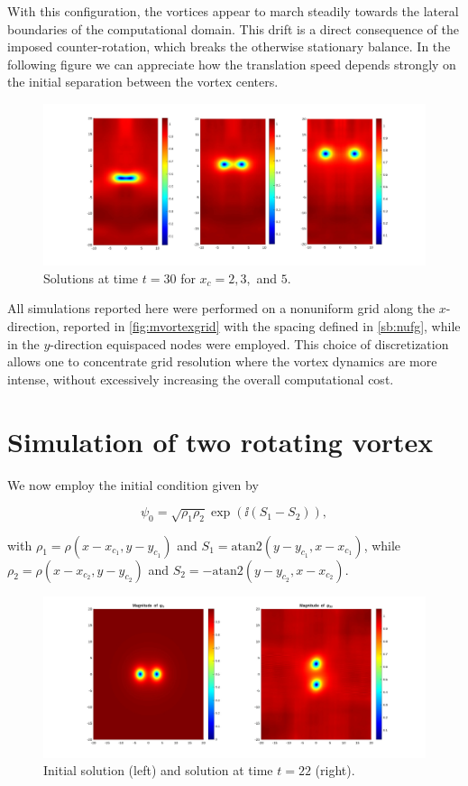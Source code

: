 With this configuration, the vortices appear to march steadily towards the lateral boundaries of the computational domain. This drift is a direct consequence of the imposed counter-rotation, which breaks the otherwise stationary balance. In the following figure we can appreciate how the translation speed depends strongly on the initial separation between the vortex centers.

\begin{figure}[H]
    \centering
    \includegraphics[width=\textwidth]{img/str_235_30t.pdf}
    \caption{Solutions at time $t = 30$ for $x_c = 2, 3,$ and $5$.}
\end{figure}

All simulations reported here were performed on a nonuniform grid along the $x$-direction, reported in \ref{fig:mvortexgrid} with the spacing defined in \ref{sb:nufg}, while in the $y$-direction equispaced nodes were employed. This choice of discretization allows one to concentrate grid resolution where the vortex dynamics are more intense, without excessively increasing the overall computational cost.

\section{Simulation of two rotating vortex}

We now employ the initial condition given by 

\[
    \psi_0 = \sqrt{\rho_1 \rho_2}\exp\left(\ii (S_1 - S_2)\right),
\] 

with $\rho_1 = \rho(x - x_{c_1}, y - y_{c_1})$ and $S_1 = \mathrm{atan2}(y - y_{c_1}, x - x_{c_1})$, while $\rho_2 = \rho(x - x_{c_2}, y - y_{c_2})$ and $S_2 = -\mathrm{atan2}(y - y_{c_2}, x - x_{c_2})$.

\begin{figure}[H]
    \centering
    \includegraphics[width=\textwidth]{img/rotating.pdf}
    \caption{Initial solution (left) and solution at time $t = 22$ (right).}
\end{figure}

